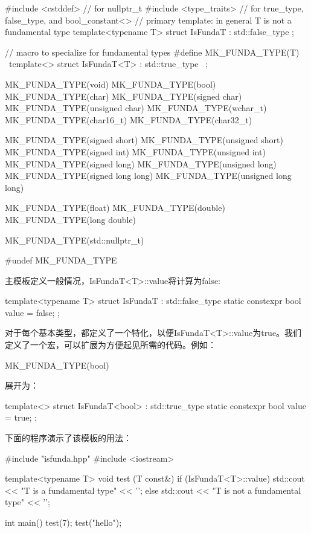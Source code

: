 \begin{cpp}
#include <cstddef> // for nullptr_t
#include <type_traits> // for true_type, false_type, and
 bool_constant<>
// primary template: in general T is not a fundamental type
template<typename T>
struct IsFundaT : std::false_type {
};

// macro to specialize for fundamental types
#define MK_FUNDA_TYPE(T) \
template<> struct IsFundaT<T> : std::true_type { \
};

MK_FUNDA_TYPE(void)
MK_FUNDA_TYPE(bool)
MK_FUNDA_TYPE(char)
MK_FUNDA_TYPE(signed char)
MK_FUNDA_TYPE(unsigned char)
MK_FUNDA_TYPE(wchar_t)
MK_FUNDA_TYPE(char16_t)
MK_FUNDA_TYPE(char32_t)

MK_FUNDA_TYPE(signed short)
MK_FUNDA_TYPE(unsigned short)
MK_FUNDA_TYPE(signed int)
MK_FUNDA_TYPE(unsigned int)
MK_FUNDA_TYPE(signed long)
MK_FUNDA_TYPE(unsigned long)
MK_FUNDA_TYPE(signed long long)
MK_FUNDA_TYPE(unsigned long long)

MK_FUNDA_TYPE(float)
MK_FUNDA_TYPE(double)
MK_FUNDA_TYPE(long double)

MK_FUNDA_TYPE(std::nullptr_t)

#undef MK_FUNDA_TYPE
\end{cpp}

主模板定义一般情况，IsFundaT<T>::value将计算为false:

\begin{cpp}
template<typename T>
struct IsFundaT : std::false_type {
	static constexpr bool value = false;
};
\end{cpp}

对于每个基本类型，都定义了一个特化，以便IsFundaT<T>::value为true。我们定义了一个宏，可以扩展为方便起见所需的代码。例如：

\begin{cpp}
MK_FUNDA_TYPE(bool)
\end{cpp}

展开为：

\begin{cpp}
template<> struct IsFundaT<bool> : std::true_type {
	static constexpr bool value = true;
};
\end{cpp}

下面的程序演示了该模板的用法：

\begin{cpp}
#include "isfunda.hpp"
#include <iostream>

template<typename T>
void test (T const&)
{
	if (IsFundaT<T>::value) {
		std::cout << "T is a fundamental type" << '\n';
	}
	else {
		std::cout << "T is not a fundamental type" << '\n';
	}
}

int main()
{
	test(7);
	test("hello");
}
\end{cpp}


